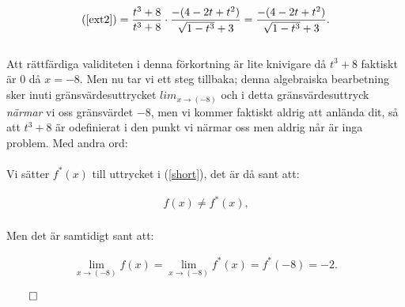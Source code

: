 \documentclass{article}
\begin{document}
\begin{gather}
  \text{(\ref{ext2})} = \frac{t^{3} + 8}{t^{3} + 8} \cdot \frac{-(4 - 2t + t^{2})}{\sqrt{1 - t^{3}} + 3} =
  \frac{-(4 - 2t + t^{2})}{\sqrt{1 - t^{3}} + 3}\text{.}
  \label{short}
\end{gather}
\\
Att rättfärdiga validiteten i denna förkortning är lite knivigare då $t^{3} + 8$ faktiskt är $0$ då $x = -8$. Men nu tar vi ett steg tillbaka; denna algebraiska bearbetning sker inuti gränsvärdesuttrycket $lim_{x \to (-8)}$ och i detta gränsvärdesuttryck \emph{närmar} vi oss gränsvärdet $-8$, men vi kommer faktiskt aldrig att anlända dit, så att $t^{3} + 8$ är odefinierat i den punkt vi närmar oss men aldrig når är inga problem. Med andra ord:
\\
\\
Vi sätter $f^{\ast}(x)$ till uttrycket i (\ref{short}), det är då sant att:

\begin{gather*}
  f(x) \neq f^{\ast}(x) \text{,}
\end{gather*}
\\
Men det är samtidigt sant att:

\begin{gather*}
  \lim_{x \to (-8)} f(x) =
  \lim_{x \to (-8)} f^{\ast}(x) =
  f^{\ast}(-8) = -2\text{.}
\end{gather*}

\centerline{$\qed$}
\end{document}
